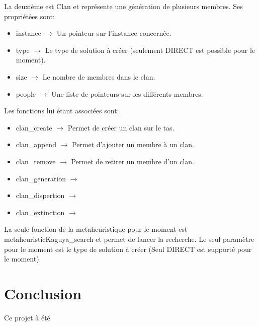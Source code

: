\documentclass{EPUProjetPeiP}
\begin{document}
La deuxième est Clan et représente une génération de plusieurs membres. Ses propriétées sont:
\begin{itemize}
	\item instance $\longrightarrow$ Un pointeur sur l'instance concernée.
	\item type $\longrightarrow$ Le type de solution à créer (seulement DIRECT est possible pour le moment).
	\item size $\longrightarrow$ Le nombre de membres dans le clan.
	\item people $\longrightarrow$ Une liste de pointeurs sur les différents membres.\\
\end{itemize}

Les fonctions lui étant associées sont:\begin{itemize}
	\item clan\_create $\longrightarrow$ Permet de créer un clan sur le tas.
	\item clan\_append $\longrightarrow$ Permet d'ajouter un membre à un clan.
	\item clan\_remove $\longrightarrow$ Permet de retirer un membre d'un clan.
	\item clan\_generation $\longrightarrow$ %
	\item clan\_dispertion $\longrightarrow$ %
	\item clan\_extinction $\longrightarrow$ %
	\\
\end{itemize}

La seule fonction de la metaheuristique pour le moment est metaheuristicKaguya\_search et permet de lancer la recherche. Le seul paramètre pour le moment est le type de solution à créer (Seul DIRECT est supporté pour le moment).

\chapter*{Conclusion}

\label{sec:conclusion}

Ce projet à été


\appendix
{}
\end{document}
